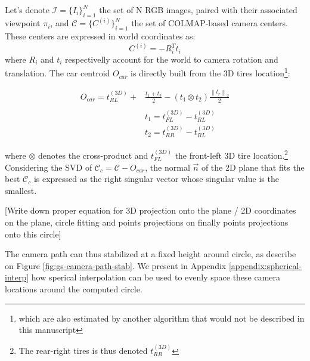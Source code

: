 Let's denote $\mathcal{I}=\{I_{i}\}_{i=1}^{N}$ the set of N RGB images, paired with their associated viewpoint $\pi_{i}$, and  $\mathcal{C} = \{C^{(i)}\}_{i=1}^{N}$ the set of COLMAP-based camera centers. These centers are expressed in world coordinates as: 
\begin{equation}
  C^{(i)}=-R_{i}^{T}t_{i}
\end{equation}
 where $R_{i}$ and $t_{i}$ respectivelly account for the world to camera rotation and translation. The car centroid $O_{car}$ is directly built from the 3D tires location\footnote{which are also estimated by another algorithm that would not be described in this manuscript}: 

\begin{equation}
  \begin{split}
  O_{car} = t_{RL}^{(3D)} + & \frac{t_{1}+t_{2}}{2} -(t_{1}\otimes t_{2})\frac{\left\lVert t_{r}\right\lVert_{2}}{2} \\ \\
  & t_{1} = t_{FL}^{(3D)} - t_{RL}^{(3D)} \\
  & t_{2} = t_{RR}^{(3D)} - t_{RL}^{(3D)} 
  \end{split}
  \end{equation}

where $\otimes$ denotes the cross-product and $t_{FL}^{(3D)}$ the front-left 3D tire location.\footnote{The rear-right tires is thus denoted $t_{RR}^{(3D)}$} Considering the \ac{SVD} of $\mathcal{C}_{c} = \mathcal{C} - O_{car}$, the normal $\vec{n}$ of the 2D plane that fits the best $\mathcal{C}_{c}$ is expressed as the right singular vector whose singular value is the smallest. 

[Write down proper equation for 3D projection onto the plane / 2D coordinates on the plane, circle fitting and points projections on finally points projections onto this circle]

The camera path can thus stabilized at a fixed height around circle, as describe on Figure \ref{fig:gs-camera-path-stab}. We present in Appendix \ref{appendix:spherical-interp} how sperical interpolation can be used to evenly space these camera locations around the computed circle. 


